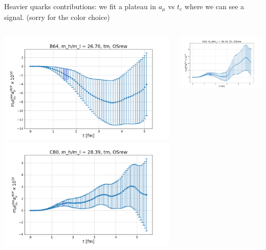 \documentclass[xcolor={dvipsnames,table}]{beamer}
\begin{document}
\begin{frame}
 Heavier quarks contributions: we fit a plateau in $a_\mu$ vs $t_c$ where we can see a signal. (sorry for the color choice)
    \begin{columns}
    \begin{column}{0.5\textwidth}
     \includegraphics[trim=0cm 0.3cm 0cm 1.2cm, clip,width=\textwidth]{plots/der_mq_sea_lore/amu_B64_tm_der_026ml.png}
     \includegraphics[trim=0cm 0.3cm 0cm 1.2cm, clip,width=\textwidth]{plots/der_mq_sea_lore/amu_C80_tm_der_028ml.png}
    \end{column}
    \begin{column}{0.5\textwidth}
     \includegraphics[trim=0cm 0.3cm 0cm 1.2cm, clip,width=\textwidth]{plots/der_mq_sea_lore/amu_B64_OS_der_026ml.png}

\end{column}
\end{columns}
\end{frame}
\end{document}
